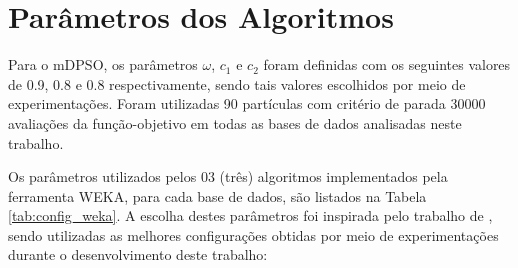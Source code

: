 \documentclass[
	12pt,				%
	openany,			%
	oneside,	
	a4paper,			%
	brazil,				%
	]{unimontes-ppgmsc-abntex2}
\begin{document}
\section{Parâmetros dos Algoritmos}

Para o mDPSO, os parâmetros $\omega$, $c_1$ e $c_2$ foram definidas com os seguintes valores de 0.9, 0.8 e 0.8 respectivamente, sendo tais valores escolhidos por meio de experimentações. Foram utilizadas 90 partículas com critério de parada 30000 avaliações da função-objetivo em todas as bases de dados analisadas neste trabalho.

Os parâmetros utilizados pelos 03 (três) algoritmos implementados pela ferramenta WEKA, para cada base de dados, são listados na Tabela \ref{tab:config_weka}. A escolha destes parâmetros foi inspirada pelo trabalho de , sendo utilizadas as melhores configurações obtidas por meio de experimentações durante o desenvolvimento deste trabalho:

\begin{table}[ht]
\setlength{\arrayrulewidth}{.2em}
\vspace{12pt}
\centering{}
\caption{Parâmetros de configuração do WEKA em cada base de dados.}
\label{tab:config_weka}
\end{table}
\end{document}
